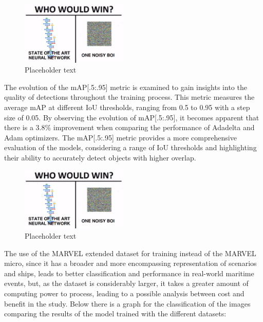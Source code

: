 \documentclass[a4paper,12pt]{article}
\begin{document}
\begin{multicols}{2}
\begin{figure}[H]
    \centering
    \includegraphics[width=0.45\textwidth]{placeholder}
    \caption{Placeholder text}
    \label{fig:1}
\end{figure}

The evolution of the mAP[.5:.95] metric is examined to gain insights into the quality of detections throughout the training process.
This metric measures the average mAP at different IoU thresholds, ranging from 0.5 to 0.95 with a step size of 0.05.
By observing the evolution of mAP[.5:.95], it becomes apparent that there is a 3.8\% improvement when comparing the performance of Adadelta and Adam optimizers.
The mAP[.5:.95] metric provides a more comprehensive evaluation of the models, considering a range of IoU thresholds and highlighting their ability to accurately detect objects with higher overlap.

\begin{figure}[H]
    \centering
    \includegraphics[width=0.45\textwidth]{placeholder}
    \caption{Placeholder text}
    \label{fig:2}
\end{figure}



The use of the MARVEL extended dataset for training instead of the MARVEL micro, since it has a broader and more encompassing representation of scenarios and ships, leads to better classification and performance in real-world maritime events, but, as the dataset is considerably larger, it takes a greater amount of computing power to process, leading to a possible analysis between cost and benefit in the study. Below there is a graph for the classification of the images comparing the results of the model trained with the different datasets:


\end{multicols}
\end{document}
